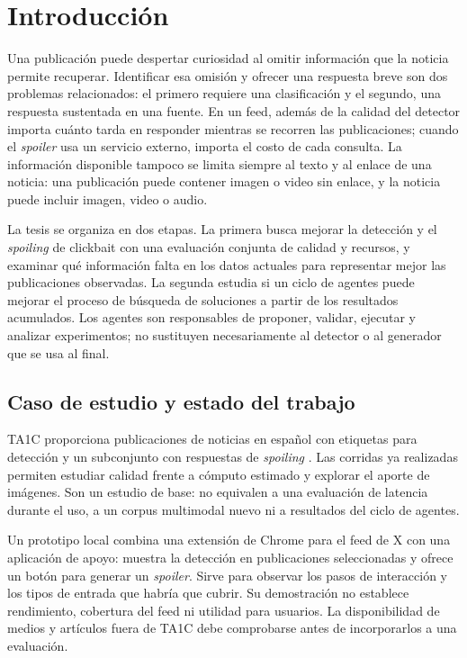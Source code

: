 \chapter{Introducción}
\label{cap:introduccion}

Una publicación puede despertar curiosidad al omitir información que la noticia permite recuperar. Identificar esa omisión y ofrecer una respuesta breve son dos problemas relacionados: el primero requiere una clasificación y el segundo, una respuesta sustentada en una fuente. En un feed, además de la calidad del detector importa cuánto tarda en responder mientras se recorren las publicaciones; cuando el \emph{spoiler} usa un servicio externo, importa el costo de cada consulta. La información disponible tampoco se limita siempre al texto y al enlace de una noticia: una publicación puede contener imagen o video sin enlace, y la noticia puede incluir imagen, video o audio.

La tesis se organiza en dos etapas. La primera busca mejorar la detección y el \emph{spoiling} de clickbait con una evaluación conjunta de calidad y recursos, y examinar qué información falta en los datos actuales para representar mejor las publicaciones observadas. La segunda estudia si un ciclo de agentes puede mejorar el proceso de búsqueda de soluciones a partir de los resultados acumulados. Los agentes son responsables de proponer, validar, ejecutar y analizar experimentos; no sustituyen necesariamente al detector o al generador que se usa al final.

\section{Caso de estudio y estado del trabajo}

TA1C proporciona publicaciones de noticias en español con etiquetas para detección y un subconjunto con respuestas de \emph{spoiling} \citep{mordecki2025,ta1c2025}. Las corridas ya realizadas permiten estudiar calidad frente a cómputo estimado y explorar el aporte de imágenes. Son un estudio de base: no equivalen a una evaluación de latencia durante el uso, a un corpus multimodal nuevo ni a resultados del ciclo de agentes.

Un prototipo local combina una extensión de Chrome para el feed de X con una aplicación de apoyo: muestra la detección en publicaciones seleccionadas y ofrece un botón para generar un \emph{spoiler}. Sirve para observar los pasos de interacción y los tipos de entrada que habría que cubrir. Su demostración no establece rendimiento, cobertura del feed ni utilidad para usuarios. La disponibilidad de medios y artículos fuera de TA1C debe comprobarse antes de incorporarlos a una evaluación.

